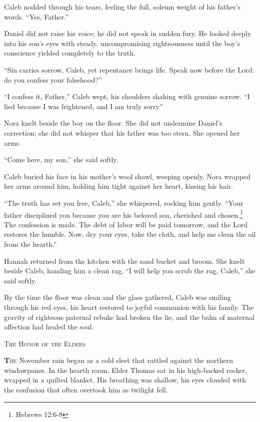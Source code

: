 \documentclass[11pt]{article}
\begin{document}
Caleb nodded through his tears, feeling the full, solemn weight of his father's words. ``Yes, Father.''

Daniel did not raise his voice; he did not speak in sudden fury. He looked deeply into his son's eyes with steady, uncompromising righteousness until the boy's conscience yielded completely to the truth.

``Sin carries sorrow, Caleb, yet repentance brings life. Speak now before the Lord: do you confess your falsehood?''

``I confess it, Father,'' Caleb wept, his shoulders shaking with genuine sorrow. ``I lied because I was frightened, and I am truly sorry.''

Nora knelt beside the boy on the floor. She did not undermine Daniel's correction; she did not whisper that his father was too stern. She opened her arms.

``Come here, my son,'' she said softly.

Caleb buried his face in his mother's wool shawl, weeping openly. Nora wrapped her arms around him, holding him tight against her heart, kissing his hair.

``The truth has set you free, Caleb,'' she whispered, rocking him gently. ``Your father disciplined you because you are his beloved son, cherished and chosen.\footnote{Hebrews 12:6-8} The confession is made. The debt of labor will be paid tomorrow, and the Lord restores the humble. Now, dry your eyes, take the cloth, and help me clean the oil from the hearth.''

Hannah returned from the kitchen with the sand bucket and broom. She knelt beside Caleb, handing him a clean rag. ``I will help you scrub the rug, Caleb,'' she said softly.

By the time the floor was clean and the glass gathered, Caleb was smiling through his red eyes, his heart restored to joyful communion with his family. The gravity of righteous paternal rebuke had broken the lie, and the balm of maternal affection had healed the soul.

\newpage

\begin{center}
    {\scshape\large The Honor of the Elders}\par
    \vspace{0.2in}
\end{center}

\lettrine[lines=3,findent=1pt,nindent=0pt]{\textbf{T}}{he} November rain began as a cold sleet that rattled against the northern windowpanes. In the hearth room, Elder Thomas sat in his high-backed rocker, wrapped in a quilted blanket. His breathing was shallow, his eyes clouded with the confusion that often overtook him as twilight fell.
\end{document}
